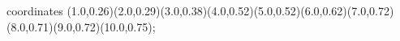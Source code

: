 					coordinates { (1.0,0.26)(2.0,0.29)(3.0,0.38)(4.0,0.52)(5.0,0.52)(6.0,0.62)(7.0,0.72)(8.0,0.71)(9.0,0.72)(10.0,0.75)};